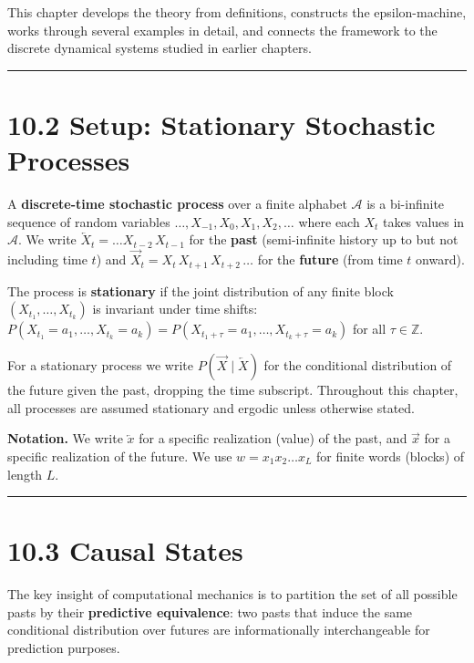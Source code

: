 This chapter develops the theory from definitions, constructs the epsilon-machine, works through several examples in detail, and connects the framework to the discrete dynamical systems studied in earlier chapters.

\bigskip\hrule\bigskip

\section{10.2 Setup: Stationary Stochastic Processes}

\begin{definition}
A \textbf{discrete-time stochastic process} over a finite alphabet $\mathcal{A}$ is a bi-infinite sequence of random variables $\ldots, X_{-1}, X_0, X_1, X_2, \ldots$ where each $X_t$ takes values in $\mathcal{A}$. We write $\overleftarrow{X}_t = \ldots X_{t-2}\, X_{t-1}$ for the \textbf{past} (semi-infinite history up to but not including time $t$) and $\overrightarrow{X}_t = X_t\, X_{t+1}\, X_{t+2}\, \ldots$ for the \textbf{future} (from time $t$ onward).
\end{definition}

\begin{definition}[Stationarity]
The process is \textbf{stationary} if the joint distribution of any finite block $(X_{t_1}, \ldots, X_{t_k})$ is invariant under time shifts: $P(X_{t_1} = a_1, \ldots, X_{t_k} = a_k) = P(X_{t_1+\tau} = a_1, \ldots, X_{t_k+\tau} = a_k)$ for all $\tau \in \mathbb{Z}$.

For a stationary process we write $P(\overrightarrow{X} \mid \overleftarrow{X})$ for the conditional distribution of the future given the past, dropping the time subscript. Throughout this chapter, all processes are assumed stationary and ergodic unless otherwise stated.

\textbf{Notation.} We write $\overleftarrow{x}$ for a specific realization (value) of the past, and $\overrightarrow{x}$ for a specific realization of the future. We use $w = x_1 x_2 \ldots x_L$ for finite words (blocks) of length $L$.

\bigskip\hrule\bigskip
\end{definition}

\section{10.3 Causal States}

The key insight of computational mechanics is to partition the set of all possible pasts by their \textbf{predictive equivalence}: two pasts that induce the same conditional distribution over futures are informationally interchangeable for prediction purposes.

